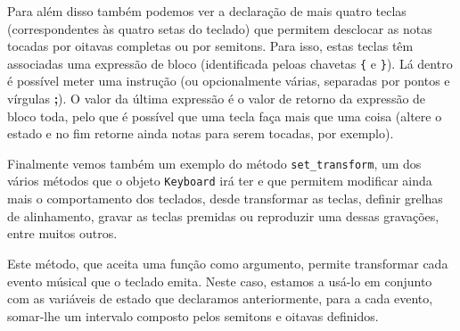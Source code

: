 Para além disso também podemos ver a declaração de mais quatro teclas (correspondentes às quatro setas do teclado) que permitem desclocar as notas tocadas por oitavas completas ou por semitons. Para isso, estas teclas têm associadas uma expressão de bloco (identificada peloas chavetas \texttt{\{} e \texttt{\}}). Lá dentro é possível meter uma instrução (ou opcionalmente várias, separadas por pontos e vírgulas \textbf{;}). O valor da última expressão é o valor de retorno da expressão de bloco toda, pelo que é possível que uma tecla faça mais que uma coisa (altere o estado e no fim retorne ainda notas para serem tocadas, por exemplo).

Finalmente vemos também um exemplo do método \texttt{set\_transform}, um dos vários métodos que o objeto \texttt{Keyboard} irá ter e que permitem modificar ainda mais o comportamento dos teclados, desde transformar as teclas, definir grelhas de alinhamento, gravar as teclas premidas ou reproduzir uma dessas gravações, entre muitos outros.

Este método, que aceita uma função como argumento, permite transformar cada evento músical que o teclado emita. Neste caso, estamos a usá-lo em conjunto com as variáveis de estado que declaramos anteriormente, para a cada evento, somar-lhe um intervalo composto pelos semitons e oitavas definidos.

